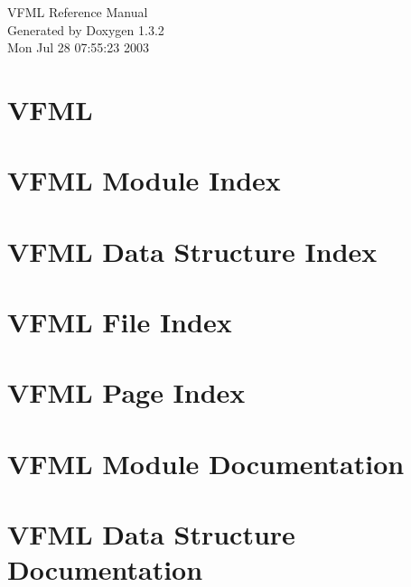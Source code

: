 \documentclass[a4paper]{book}
\begin{document}
\begin{titlepage}
\vspace*{7cm}
\begin{center}
{\Large VFML Reference Manual}\\
\vspace*{1cm}
{\large Generated by Doxygen 1.3.2}\\
\vspace*{0.5cm}
{\small Mon Jul 28 07:55:23 2003}\\
\end{center}
\end{titlepage}
\clearemptydoublepage
{}
\tableofcontents
\clearemptydoublepage
{}
\chapter{VFML }
\label{index}
\chapter{VFML Module Index}

\chapter{VFML Data Structure Index}

\chapter{VFML File Index}

\chapter{VFML Page Index}

\chapter{VFML Module Documentation}







\chapter{VFML Data Structure Documentation}














\end{document}
